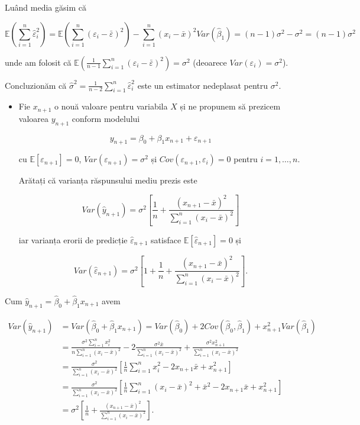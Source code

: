 \documentclass[]{article}
\newenvironment{frshaded*}{%
  \def\FrameCommand{\fboxrule=\FrameRule\fboxsep=\FrameSep \fcolorbox{framecolor}{shadecolor1}}%
  \MakeFramed {\advance\hsize-\width \FrameRestore}}%
{\endMakeFramed}
\newenvironment{rmdblock}[1]
  {\begin{frshaded*}
  \begin{itemize}
  \renewcommand{\labelitemi}{
    \raisebox{-.7\height}[0pt][0pt]{
      {\setkeys{Gin}{width=2em,keepaspectratio}\texttt{[image: images/icons/\#1]}}
    }
  }
  \item
  }
  {
  \end{itemize}
  \end{frshaded*}
  }
\newenvironment{rmdexercise}
  {\begin{rmdblock}{exercise}}
  {\end{rmdblock}}
\begin{document}
Luând media găsim că

\[
\mathbb{E}\left(\sum_{i = 1}^{n}\hat\varepsilon_i^2\right) = \mathbb{E}\left(\sum_{i = 1}^{n}(\varepsilon_i - \bar\varepsilon)^2\right) - \sum_{i = 1}^{n}(x_i - \bar x)^2 Var(\hat\beta_1) = (n-1)\sigma^2 - \sigma^2 = (n-1)\sigma^2
\]

unde am folosit că
\(\mathbb{E}\left(\frac{1}{n-1}\sum_{i = 1}^{n}(\varepsilon_i - \bar\varepsilon)^2\right) = \sigma^2\)
(deoarece \(Var(\varepsilon_i) = \sigma^2\)).

Concluzionăm că
\(\hat\sigma^2 = \frac{1}{n-2}\sum_{i = 1}^{n}\hat\varepsilon_i^2\) este
un estimator nedeplasat pentru \(\sigma^2\).

\begin{rmdexercise}
Fie \(x_{n+1}\) o nouă valoare pentru variabila \(X\) și ne propunem să
prezicem valoarea \(y_{n+1}\) conform modelului

\[
  y_{n+1} = \beta_0 + \beta_1 x_{n+1} + \varepsilon_{n+1}
\]

cu \(\mathbb{E}[\varepsilon_{n+1}] = 0\),
\(Var(\varepsilon_{n+1}) = \sigma^2\) și
\(Cov(\varepsilon_{n+1}, \varepsilon_i)=0\) pentru \(i = 1,\ldots,n\).

Arătați că varianța răspunsului mediu prezis este

\[
  Var(\hat y_{n+1}) = \sigma^2\left[\frac{1}{n} + \frac{(x_{n+1} - \bar x)^2}{\sum_{i=1}^{n}(x_i - \bar x)^2}\right]
\]

iar varianța erorii de predicție \(\hat\varepsilon_{n+1}\) satisface
\(\mathbb{E}[\hat\varepsilon_{n+1}] = 0\) și

\[
  Var(\hat\varepsilon_{n+1}) = \sigma^2\left[1 + \frac{1}{n} + \frac{(x_{n+1} - \bar x)^2}{\sum_{i=1}^{n}(x_i - \bar x)^2}\right].
\]
\end{rmdexercise}

Cum \(\hat y_{n+1} = \hat\beta_0 + \hat\beta_1 x_{n+1}\) avem

\begin{align*}
  Var(\hat y_{n+1}) &= Var(\hat\beta_0 + \hat\beta_1 x_{n+1}) = Var(\hat\beta_0) + 2Cov(\hat\beta_0, \hat\beta_1) + x_{n+1}^2Var(\hat\beta_1)\\
  &= \frac{\sigma^2\sum_{i = 1}^{n}x_i^2}{n\sum_{i = 1}^{n}(x_i - \bar x)^2} - 2\frac{\sigma^2 \bar x}{\sum_{i = 1}^{n}(x_i - \bar x)^2} + \frac{\sigma^2x_{n+1}^2}{\sum_{i = 1}^{n}(x_i - \bar x)^2}\\
  &= \frac{\sigma^2}{\sum_{i = 1}^{n}(x_i - \bar x)^2}\left[\frac{1}{n}\sum_{i = 1}^{n}x_i^2 - 2x_{n+1}\bar x + x_{n+1}^2\right]\\
  &= \frac{\sigma^2}{\sum_{i = 1}^{n}(x_i - \bar x)^2}\left[\frac{1}{n}\sum_{i = 1}^{n}(x_i -\bar x)^2 + \bar x^2 - 2x_{n+1}\bar x + x_{n+1}^2\right]\\
  &= \sigma^2\left[\frac{1}{n} + \frac{(x_{n+1} - \bar x)^2}{\sum_{i=1}^{n}(x_i - \bar x)^2}\right].
\end{align*}
\end{document}
